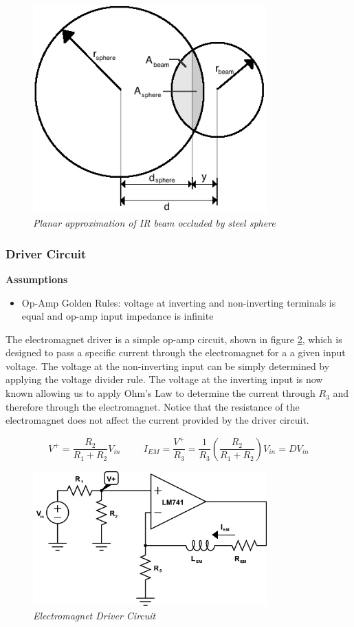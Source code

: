 \documentclass{article}
\theoremstyle{plain}
\theoremstyle{definition}
\theoremstyle{remark}
\begin{document}
\begin{figure}
\begin{center}
\includegraphics[width = 9cm]{beam_sphere_diagram.png}
\caption{\emph{Planar approximation of IR beam occluded by steel sphere}}
\label{Q1_a1}
\end{center}
\end{figure}

\subsubsection*{Driver Circuit}
\textbf{Assumptions}
\begin{itemize}
\item Op-Amp Golden Rules: voltage at inverting and non-inverting terminals is equal and op-amp input impedance is infinite
\end{itemize}

The electromagnet driver is a simple op-amp circuit, shown in figure \ref{Q1_a2}, which is designed to pass a specific current through the electromagnet for a a given input voltage.  The voltage at the non-inverting input can be simply determined by applying the voltage divider rule.  The voltage at the inverting input is now known allowing us to apply Ohm's Law to determine the current through $R_{3}$ and therefore through the electromagnet.  Notice that the resistance of the electromagnet does not affect the current provided by the driver circuit.

$$ V^{+}=\frac{R_2}{R_1+R_2}V_{in} \hspace{1cm} I_{EM}=\frac{V^{+}}{R_3}=\frac{1}{R_3}\left(\frac{R_2}{R_1+R_2}\right)V_{in} = DV_{in}$$

\begin{figure}
\begin{center}
\includegraphics[width = 9cm]{em_driver_circuit.png}
\end{center}
\label{Q1_a2}
\caption{\emph{Electromagnet Driver Circuit}}
\end{figure}
\end{document}
